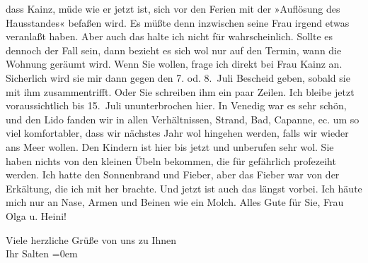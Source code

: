                dass Kainz, müde wie er jetzt ist, sich vor
               den Ferien mit der »Auflösung des Hausstandes« befaßen wird. Es müßte denn inzwischen
               seine Frau irgend etwas
               veranlaßt haben. Aber auch das halte ich nicht für wahrscheinlich. Sollte es dennoch
               der Fall sein, dann bezieht es sich wol nur auf den Termin, wann die Wohnung geräumt
               wird. Wenn Sie wollen, frage ich direkt bei Frau Kainz an. Sicherlich wird sie mir dann gegen den 7. od. 8. Juli Bescheid geben, sobald sie
               mit ihm zusammentrifft. Oder Sie schreiben ihm ein paar Zeilen. Ich bleibe jetzt
               voraussichtlich bis 15. Juli ununterbrochen hier. In Venedig war es sehr schön, und den Lido fanden wir in allen Verhältnissen, Strand, Bad, Capanne,
               ec. um so viel komfortabler, dass wir nächstes Jahr wol hingehen werden, falls wir
               wieder ans Meer wollen. Den Kindern ist hier bis jetzt und unberufen sehr wol. Sie
               haben nichts von den kleinen Übeln bekommen, die für gefährlich profezeiht werden.
               Ich hatte den Sonnenbrand und Fieber, aber das Fieber war von der Erkältung, die ich
               mit her brachte. Und jetzt ist auch das längst vorbei. Ich häute mich nur an Nase,
               Armen und Beinen wie ein Molch. Alles Gute für Sie, Frau Olga u. Heini!\pend
           
\pstart
           Viele herzliche Grüße von uns zu Ihnen {\\[\baselineskip]}Ihr \spacefill\mbox{Salten}\pend
           \leftskip=0em{}\endnumbering{}  \newcommand{\dateiname}{L03501}\newcommand{\titel}{Felix Salten an Arthur Schnitzler, 29. 6. 1909}\newcommand{\editorInnen}{Martin Anton Müller und Laura Untner}
